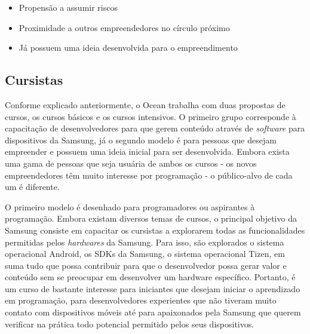 \begin{itemize}
\item Propensão a assumir riscos
\item Proximidade a outros empreendedores no círculo próximo
\item Já possuem uma ideia desenvolvida para o empreendimento
\end{itemize}


\subsection{Cursistas}
\label{sec:con_cursistas}

Conforme explicado anteriormente, o Ocean trabalha com duas propostas de cursos, os cursos básicos e os cursos intensivos. O primeiro grupo corresponde à capacitação de desenvolvedores para que gerem conteúdo através de \textit{software} para dispositivos da Samsung, já o segundo modelo é para pessoas que desejam empreender e possuem uma ideia inicial para ser desenvolvida. Embora exista uma gama de pessoas que seja usuária de ambos os cursos - os novos empreendedores têm muito interesse por programação - o público-alvo de cada um é diferente.

O primeiro modelo é desenhado para programadores ou aspirantes à programação. Embora existam diversos temas de cursos, o principal objetivo da Samsung consiste em capacitar os cursistas a explorarem todas as funcionalidades permitidas pelos \textit{hardwares} da Samsung. Para isso, são explorados o sistema operacional Android, os SDKs da Samsung, o sistema operacional Tizen, em suma tudo que possa contribuir para que o desenvolvedor possa gerar valor e conteúdo sem se preocupar em desenvolver um hardware específico. Portanto, é um curso de bastante interesse para iniciantes que desejam iniciar o aprendizado em programação, para desenvolvedores experientes que não tiveram muito contato com dispositivos móveis até para apaixonados pela Samsung que querem verificar na prática todo potencial permitido pelos seus dispositivos.

